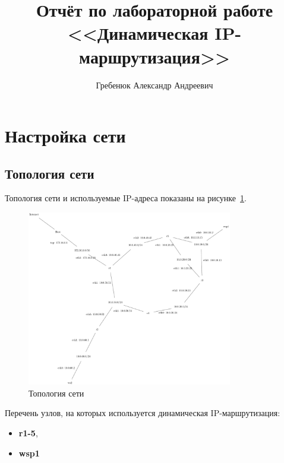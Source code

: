 \documentclass[a4paper,12pt]{article}
\title{Отчёт по лабораторной работе \\ <<Динамическая IP-маршрутизация>>}
\author{Гребенюк Александр Андреевич}
\begin{document}
\maketitle

\tableofcontents

\section{Настройка сети}

\subsection{Топология сети}

Топология сети и используемые IP-адреса показаны на рисунке~\ref{fig:network}.

\begin{figure}
\centering
\includegraphics[width=0.8\textwidth]{includes/network_gv.pdf}
\caption{Топология сети}
\label{fig:network}
\end{figure}


Перечень узлов, на которых используется динамическая IP-маршрутизация: 
\begin{itemize}
  \item \textbf{r1-5},
  \item \textbf{wsp1}
\end{itemize}
\end{document}
